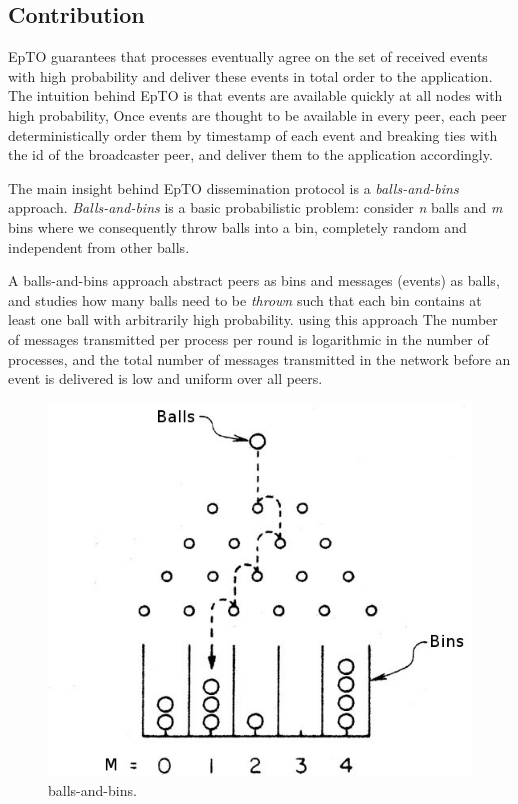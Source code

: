 \documentclass[10pt,conference,a4paper]{IEEEtran}
\begin{document}
\subsection{Contribution}
EpTO guarantees that processes eventually agree on the set of received events with high probability and deliver these events in total order to the application. The intuition behind EpTO is that events are available quickly at all nodes with high probability,
Once events are thought to be available in every peer, each peer deterministically order them by timestamp of each event and breaking ties with the id of the broadcaster peer, and deliver them to the application accordingly.
\par
The main insight behind EpTO dissemination protocol is a \textit{balls-and-bins} approach. \textit{Balls-and-bins} is a basic probabilistic problem: consider \textit{n} balls and \textit{m} bins where we consequently throw balls into a bin, completely random and independent from other balls.
\par
A balls-and-bins approach abstract peers as bins and messages (events) as balls, and studies how many balls need to be \textit{thrown} such that each bin contains at least one ball with arbitrarily high probability. using this approach The number of messages transmitted per process per round is logarithmic in the number of processes, and the total number of messages
transmitted in the network before an event is delivered is low and uniform over all peers.

\begin{figure}
\includegraphics[width=\linewidth]{figures/BnB.jpeg}
\caption{balls-and-bins\protect\footnotemark{}.}
\label{fig:balls-and-bins}
\end{figure}
\end{document}
